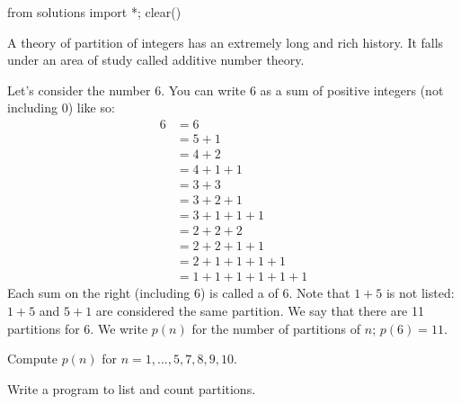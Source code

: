 \begin{python0}
from solutions import *; clear() 
\end{python0}

A theory of partition of integers has an extremely long and rich history.
It falls under an area of study called additive number theory.

Let's consider the number 6.
You can write 6 as a sum of positive integers (not including 0) like so:
\begin{align*}
6
&= 6 \\
&= 5 + 1\\
&= 4 + 2 \\
&= 4 + 1 + 1 \\
&= 3 + 3 \\
&= 3 + 2 + 1 \\
&= 3 + 1 + 1 + 1 \\
&= 2 + 2 + 2 \\
&= 2 + 2 + 1 + 1 \\
&= 2 + 1 + 1 + 1 + 1 \\
&= 1 + 1 + 1 + 1 + 1 + 1 
\end{align*}
Each sum on the right (including $6$) is called a  of $6$.
Note that $1 + 5$ is not listed: $1 + 5$ and $5 + 1$ are considered
the same partition.
We say that there are 11 partitions for $6$.
We write $p(n)$ for the number of partitions of $n$;
$p(6) = 11$.


\newpage
\begin{ex}
Compute $p(n)$ for $n = 1, ..., 5, 7, 8, 9, 10$.
\end{ex}


\newpage
\begin{ex}
Write a program to list and count partitions.
\end{ex}


